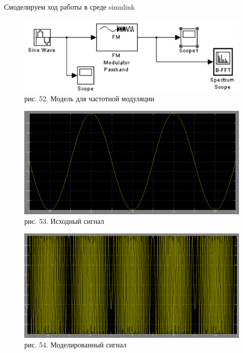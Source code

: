 \documentclass[10pt,a4paper]{report}
\begin{document}
Смоделируем ход работы в среде simulink
\begin{figure}
\begin{center}
\includegraphics[width=150mm, scale = 0.9]{8_3}\newline
рис. 52. Модель для частотной модуляции\newline
\end{center}
\end{figure}
\begin{figure}
\begin{center}
\includegraphics[width=150mm, scale = 0.9]{8_4}\newline
рис. 53. Исходный сигнал\newline
\end{center}
\end{figure}
\begin{figure}
\begin{center}
\includegraphics[width=150mm, scale = 0.9]{8_5}\newline
рис. 54. Моделированный сигнал\newline
\end{center}
\end{figure}
\end{document}
